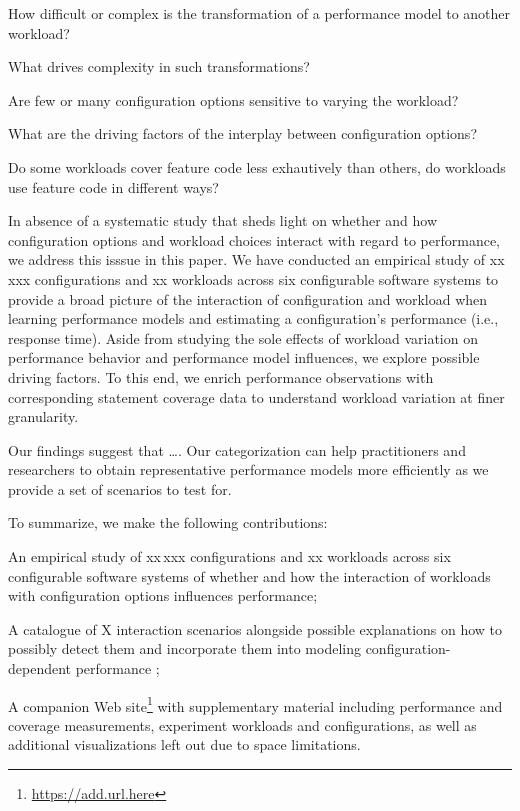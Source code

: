 \begin{compactitem}
	\item How difficult or complex is the transformation of a performance model to another workload? 
	\item What drives complexity in such transformations? 
	\item Are few or many configuration options sensitive to varying the workload?
	\item What are the driving factors of the interplay between configuration options? 
	\item Do some workloads cover feature code less exhautively than others, do workloads use feature code in different ways?
\end{compactitem}

In absence of a systematic study that sheds light on whether and how configuration options and workload choices interact with regard to performance, we address this isssue in this paper. 
We have conducted an empirical study of {\color{red}xx\,xxx} configurations and {\color{red}xx} workloads across six configurable software systems to provide a broad picture of the interaction of configuration and workload when learning performance models and estimating a configuration's performance (i.e., response time). Aside from studying the sole effects of workload variation on performance behavior and performance model influences, we explore possible driving factors. To this end, we enrich performance observations with corresponding statement coverage data to understand workload variation at finer granularity.

Our findings suggest that {\color{red} \ldots. Our categorization can help practitioners and researchers to obtain representative performance models more efficiently as we provide a set of scenarios to test for.}

To summarize, we make the following contributions: 

\begin{compactitem}
	\item An empirical study of {\color{red}xx\,xxx} configurations and {\color{red}xx} workloads across six configurable software systems of whether and how the interaction of workloads with configuration options influences performance;
	
	\item A catalogue of {\color{red}X} interaction scenarios alongside possible explanations on how to possibly detect them and incorporate them into modeling configuration-dependent performance	;
	
	\item A companion Web site\footnote{\url{https://add.url.here}} with supplementary material including performance and coverage measurements, experiment workloads and configurations, as well as additional visualizations left out due to space limitations.
\end{compactitem}


